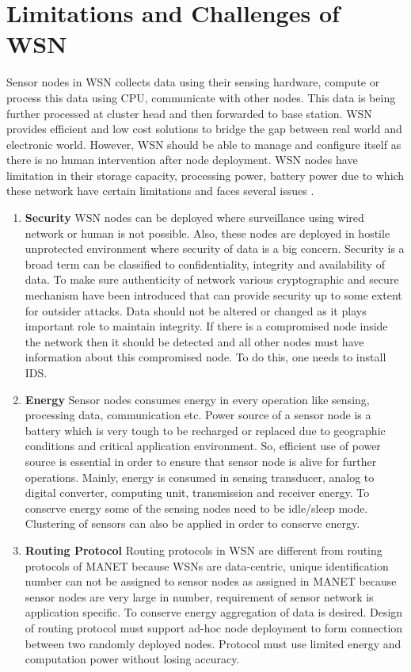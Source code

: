 \section{Limitations and Challenges of WSN} \label{WSNChallenges}
Sensor nodes in WSN collects data using their sensing hardware, compute or process this data using CPU, communicate with other nodes. This data is being further processed at cluster head and then forwarded to base station. WSN provides efficient and low cost solutions to bridge the gap between real world and electronic world. However, WSN should be able to manage and configure itself as there is no human intervention after node deployment. WSN nodes have limitation in their storage capacity, processing power, battery power due to which these network have certain limitations and faces several issues \cite{sharma2013issues}.
\begin{enumerate}[label=\textbf{\roman*.}]
    \item \textbf{Security }
    WSN nodes can be deployed where surveillance using wired network or human is not possible. Also, these nodes are deployed in hostile unprotected environment where security of data is a big concern. Security is a broad term can be classified to confidentiality, integrity and availability of data. To make sure authenticity of network various cryptographic and secure mechanism have been introduced that can provide security up to some extent for outsider attacks. Data should not be altered or changed as it plays important role to maintain integrity. If there is a compromised node inside the network then it should be detected and all other nodes must have information about this compromised node. To do this, one needs to install IDS.
    \item \textbf{Energy }
    Sensor nodes consumes energy in every operation like sensing, processing data, communication etc. Power source of a sensor node is a battery which is very tough to be recharged or replaced due to geographic conditions and critical application environment. So, efficient use of power source is essential in order to ensure that sensor node is alive for further operations. Mainly, energy is consumed in sensing transducer, analog to digital converter, computing unit, transmission and receiver energy. To conserve energy some of the sensing nodes need to be idle/sleep mode. Clustering of sensors can also be applied in order to conserve energy.
    \item \textbf{Routing Protocol }
    Routing protocols in WSN are different from routing protocols of MANET because WSNs are data-centric, unique identification number can not be assigned to sensor nodes as assigned in MANET because sensor nodes are very large in number, requirement of sensor network is application specific. To conserve energy aggregation of data is desired. Design of routing protocol must support ad-hoc node deployment to form connection between two randomly deployed nodes. Protocol must use limited energy and computation power without losing accuracy.

\end{enumerate}

